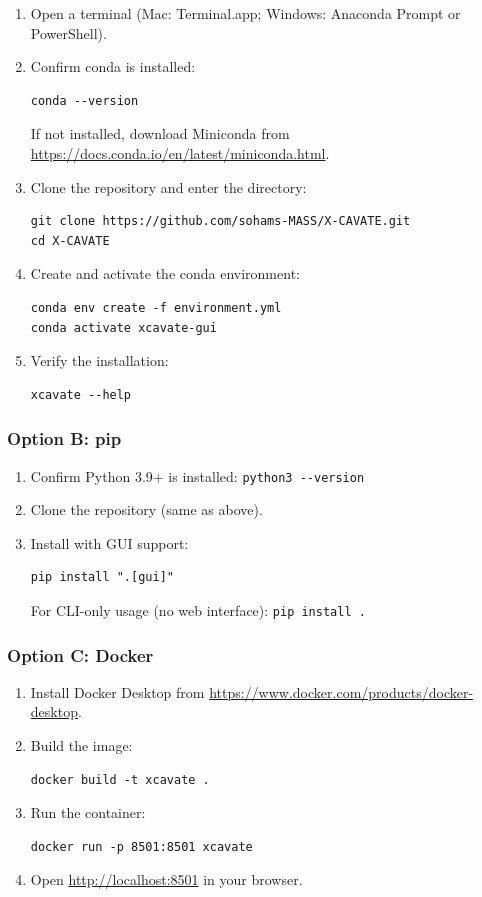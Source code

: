 \documentclass[11pt,letterpaper]{article}
\newcommand{\code}[1]{\texttt{#1}}
\begin{document}
\begin{enumerate}[leftmargin=*]
    \item Open a terminal (Mac: Terminal.app; Windows: Anaconda Prompt or PowerShell).
    \item Confirm conda is installed:
    \begin{lstlisting}
conda --version
    \end{lstlisting}
    If not installed, download Miniconda from \url{https://docs.conda.io/en/latest/miniconda.html}.
    \item Clone the repository and enter the directory:
    \begin{lstlisting}
git clone https://github.com/sohams-MASS/X-CAVATE.git
cd X-CAVATE
    \end{lstlisting}
    \item Create and activate the conda environment:
    \begin{lstlisting}
conda env create -f environment.yml
conda activate xcavate-gui
    \end{lstlisting}
    \item Verify the installation:
    \begin{lstlisting}
xcavate --help
    \end{lstlisting}
\end{enumerate}

\subsubsection{Option B: pip}

\begin{enumerate}[leftmargin=*]
    \item Confirm Python 3.9+ is installed: \code{python3 -{}-version}
    \item Clone the repository (same as above).
    \item Install with GUI support:
    \begin{lstlisting}
pip install ".[gui]"
    \end{lstlisting}
    For CLI-only usage (no web interface): \code{pip install .}
\end{enumerate}

\subsubsection{Option C: Docker}

\begin{enumerate}[leftmargin=*]
    \item Install Docker Desktop from \url{https://www.docker.com/products/docker-desktop}.
    \item Build the image:
    \begin{lstlisting}
docker build -t xcavate .
    \end{lstlisting}
    \item Run the container:
    \begin{lstlisting}
docker run -p 8501:8501 xcavate
    \end{lstlisting}
    \item Open \url{http://localhost:8501} in your browser.
\end{enumerate}
\end{document}
